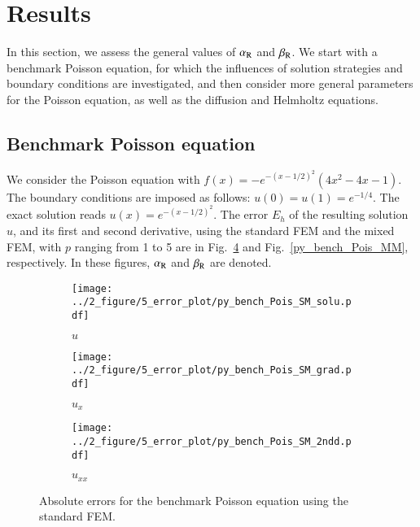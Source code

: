 \documentclass[review,3p]{elsarticle}
\begin{document}
\section{Results}  	\label{section_error_constants}

In this section, we assess the general values of $\alpha_{\rm R}$ and $\beta_{\rm R}$.
We start with a benchmark Poisson equation, for which the influences of solution strategies and boundary conditions are investigated, and then consider more general parameters for the Poisson equation, as well as the diffusion and Helmholtz equations.

\subsection{Benchmark Poisson equation}		\label{section_preliminary_results}

We consider the Poisson equation with $f(x)=-e^{- (x-1/2)^2} \left({4x^2 - 4x -1} \right)$. The boundary conditions are imposed as follows: $u(0)=u(1)= e^{-1/4}$. The exact solution reads $u(x)=e^{- (x-1/2)^2}$. The error $E_h$ of the resulting solution $u$, and its first and second derivative, using the standard FEM and the mixed FEM, with $p$ ranging from 1 to 5 are in Fig.~\ref{py_bench_Pois_SM} and Fig.~\ref{py_bench_Pois_MM}, respectively. In these figures, $\alpha_{\rm R}$ and $\beta_{\rm R}$ are denoted.

\begin{figure}[!ht]
    \begin{subfigure}{5.5cm}
        \texttt{[image: ../2\_figure/5\_error\_plot/py\_bench\_Pois\_SM\_solu.pdf]}
        \caption{$u$}
        \label{py_bench_Pois_SM_solu}
    \end{subfigure}
    \hspace{-0.2cm}
    \begin{subfigure}{5.5cm}
        \texttt{[image: ../2\_figure/5\_error\_plot/py\_bench\_Pois\_SM\_grad.pdf]}
        \caption{$u_x$}
        \label{py_bench_Pois_SM_grad}
    \end{subfigure}
    \hspace{-0.2cm}
    \begin{subfigure}{5.5cm}
        \texttt{[image: ../2\_figure/5\_error\_plot/py\_bench\_Pois\_SM\_2ndd.pdf]}
        \caption{$u_{xx}$}
        \label{py_bench_Pois_SM_2ndd}
    \end{subfigure}
\caption{Absolute errors for the benchmark Poisson equation using the standard FEM.}
\label{py_bench_Pois_SM}
\end{figure}
\end{document}

